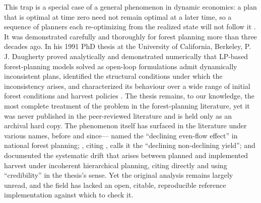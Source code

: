 This trap is a special case of a general phenomenon in dynamic economics: a plan that is optimal at time zero need not remain optimal at a later time, so a sequence of planners each re-optimizing from the realized state will not follow it \citep{strotz1956myopia,kydland1977rules}. It was demonstrated carefully and thoroughly for forest planning more than three decades ago. In his 1991 PhD thesis at the University of California, Berkeley, P. J. Daugherty proved analytically and demonstrated numerically that LP-based forest-planning models solved as open-loop formulations admit dynamically inconsistent plans, identified the structural conditions under which the inconsistency arises, and characterized its behaviour over a wide range of initial forest conditions and harvest policies \citep{daugherty1991credibility}. The thesis remains, to our knowledge, the most complete treatment of the problem in the forest-planning literature, yet it was never published in the peer-reviewed literature and is held only as an archival hard copy. The phenomenon itself has surfaced in the literature under various names, before and since---\citet{mcquillan1986declining} named the ``declining even-flow effect'' in national forest planning; \citet[pp.~331--332]{gunn2007models}, citing \citet{daugherty1991credibility}, calls it the ``declining non-declining yield''; and \citet{paradis2013risk} documented the systematic drift that arises between planned and implemented harvest under incoherent hierarchical planning, citing \citet{daugherty1991credibility} directly and using ``credibility'' in the thesis's sense. Yet the original analysis remains largely unread, and the field has lacked an open, citable, reproducible reference implementation against which to check it.

